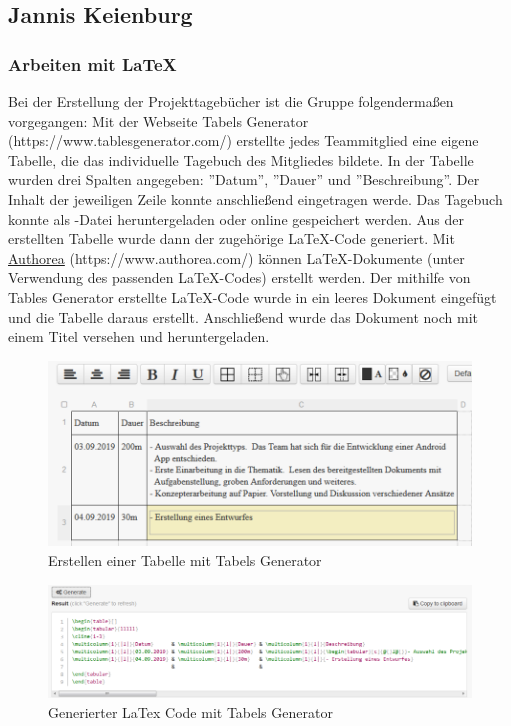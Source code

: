 \clearpage

\subsection{Jannis Keienburg}

\subsubsection{Arbeiten mit \LaTeX}

Bei der Erstellung der Projekttagebücher ist die Gruppe folgendermaßen vorgegangen: 
Mit der Webseite Tabels Generator (https://www.tablesgenerator.com/) erstellte jedes Teammitglied eine eigene Tabelle, die das individuelle Tagebuch des Mitgliedes bildete. In der Tabelle wurden drei Spalten angegeben: ''Datum'', ''Dauer'' und ''Beschreibung''. Der Inhalt der jeweiligen Zeile konnte anschließend eingetragen werde. Das Tagebuch konnte als -Datei heruntergeladen oder online gespeichert werden. Aus der erstellten Tabelle wurde dann der zugehörige \LaTeX-Code generiert. Mit \hyperlink{https://www.authorea.com/}{Authorea} (https://www.authorea.com/) können LaTeX-Dokumente (unter Verwendung des passenden \LaTeX-Codes) erstellt werden. Der mithilfe von Tables Generator erstellte \LaTeX-Code wurde in ein leeres Dokument eingefügt und die Tabelle daraus erstellt. Anschließend wurde das Dokument noch mit einem Titel versehen und heruntergeladen.  

\begin{figure}[!h]
	\includegraphics[scale=1]{img/tabels-generator-erstellen}
	\caption[Erstellen einer Tabelle mit Tabels Generator]{Erstellen einer Tabelle mit Tabels Generator\footnotemark}
\end{figure}
\FloatBarrier

\begin{figure}[!h]
	\includegraphics[scale=1]{img/tables-generator-generate}
	\caption[Generierter LaTex Code mit Tabels Generator]{Generierter LaTex Code mit Tabels Generator\footnotemark}
\end{figure}
\FloatBarrier

